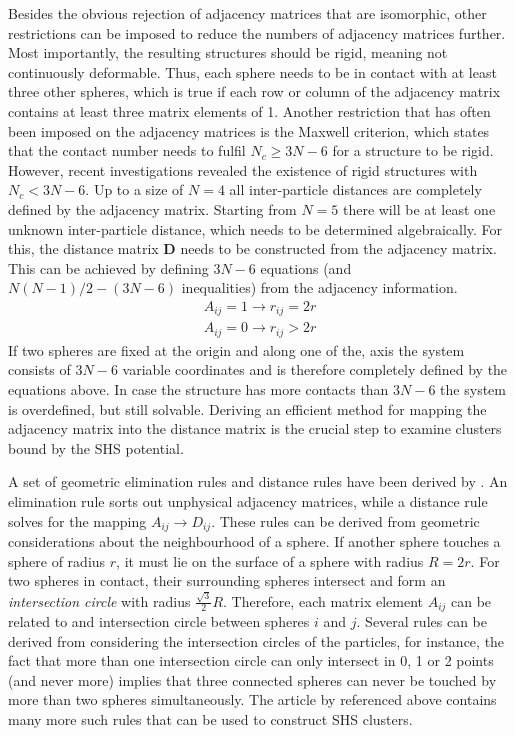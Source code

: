 Besides the obvious rejection of adjacency matrices that are isomorphic, other
restrictions can be imposed to reduce the numbers of adjacency matrices further.
Most importantly, the resulting structures should be rigid, meaning not
continuously deformable. Thus, each sphere needs to be in contact with at least
three other spheres, which is true if each row or column of the adjacency matrix
contains at least three matrix elements of 1. Another restriction that has often
been imposed on the adjacency matrices is the Maxwell criterion, which states
that the contact number needs to fulfil $N_c\geq 3N-6$ for a structure to be
rigid.\autocite{Maxwell_calculationequilibriumstiffness_1864} However, recent
investigations revealed the existence of rigid structures with $N_c<
3N-6$.\autocite{Holmes-Cerfon_EnumeratingRigidSphere_2016} Up to a size of $N=4$
all inter-particle distances are completely defined by the adjacency matrix.
Starting from $N=5$ there will be at least one unknown inter-particle distance,
which needs to be determined algebraically. For this, the distance matrix
$\mathbf{D}$ needs to be constructed from the adjacency matrix. This can be
achieved by defining $3N-6$ equations (and $N(N-1)/2 - (3N-6)$ inequalities)
from the adjacency information.
%
\begin{align}
    A_{ij}=1\rightarrow r_{ij}=2r\\
    A_{ij}=0\rightarrow r_{ij}>2r
\end{align}
%
If two spheres are fixed at the origin and along one of the, axis the system
consists of $3N-6$ variable coordinates and is therefore completely defined by
the equations above. In case the structure has more contacts than $3N-6$ the
system is overdefined, but still solvable. Deriving an efficient method for
mapping the adjacency matrix into the distance matrix is the crucial step to
examine clusters bound by the \ac{SHS} potential.

A set of geometric elimination rules and distance rules have been derived by
\citeauthor{Arkus_DerivingFiniteSphere_2011}\autocite{Arkus_DerivingFiniteSphere_2011}.
An elimination rule sorts out unphysical adjacency matrices, while a distance
rule solves for the mapping $A_{ij}\to D_{ij}$. These rules
can be derived from geometric considerations about the neighbourhood of a
sphere. If another sphere touches a sphere of radius $r$, it must lie on the
surface of a sphere with radius $R=2r$. For two spheres in contact, their
surrounding spheres intersect and form an \textit{intersection circle} with
radius $\frac{\sqrt{3}}{2}R$. Therefore, each matrix element $A_{ij}$
can be related to and intersection circle between spheres $i$ and $j$. Several
rules can be derived from considering the intersection circles of the particles,
for instance, the fact that more than one intersection circle can only intersect
in 0, 1 or 2 points (and never more) implies that three connected spheres can
never be touched by more than two spheres simultaneously. The article by
\citeauthor{Arkus_DerivingFiniteSphere_2011} referenced above contains many more
such rules that can be used to construct \ac{SHS} clusters.

